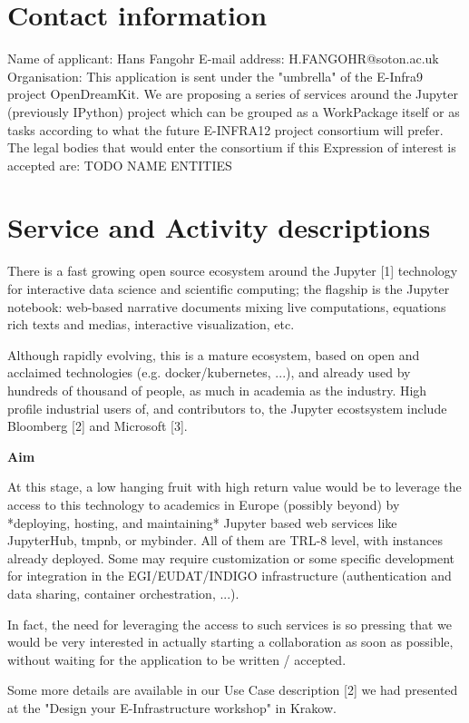\section{Contact information}

Name of applicant: Hans Fangohr E-mail address: H.FANGOHR@soton.ac.uk
Organisation: This application is sent under the "umbrella" of the
E-Infra9 project OpenDreamKit. We are proposing a series of services
around the Jupyter (previously IPython) project which can be grouped
as a WorkPackage itself or as tasks according to what the future
E-INFRA12 project consortium will prefer. The legal bodies that would
enter the consortium if this Expression of interest is accepted are:
TODO NAME ENTITIES

\section{Service and Activity descriptions}

There is a fast growing open source ecosystem around the Jupyter [1]
technology for interactive data science and scientific computing; the
flagship is the Jupyter notebook: web-based narrative documents mixing
live computations, equations rich texts and medias, interactive
visualization, etc.

Although rapidly evolving, this is a mature ecosystem, based on open
and acclaimed technologies (e.g. docker/kubernetes, ...), and already
used by hundreds of thousand of people, as much in academia as the
industry. High profile industrial users of, and contributors to, the
Jupyter ecostsystem include Bloomberg [2] and Microsoft [3].

\textbf{Aim}

At this stage, a low hanging fruit with high return value would be to
leverage the access to this technology to academics in Europe
(possibly beyond) by *deploying, hosting, and maintaining* Jupyter
based web services like JupyterHub, tmpnb, or mybinder. All of them
are TRL-8 level, with instances already deployed. Some may require
customization or some specific development for integration in the
EGI/EUDAT/INDIGO infrastructure (authentication and data sharing,
container orchestration, ...).

In fact, the need for leveraging the access to such services is so
pressing that we would be very interested in actually starting a
collaboration as soon as possible, without waiting for the application
to be written / accepted.

Some more details are available in our Use Case description [2] we had
presented at the "Design your E-Infrastructure workshop" in Krakow.

